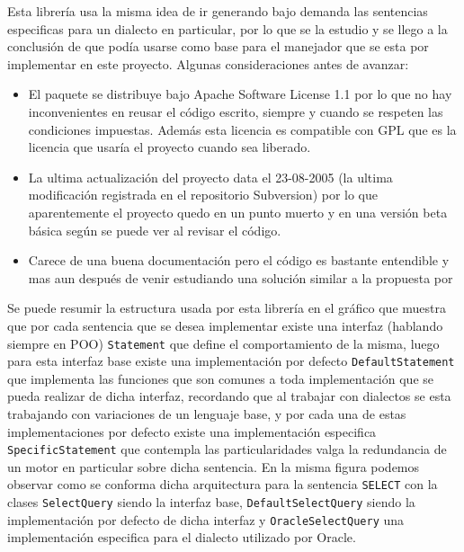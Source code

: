 Esta librería  usa la misma idea de ir generando bajo demanda las sentencias especificas para un dialecto en particular, por lo que se la estudio y se llego a la conclusión de que podía usarse como base para el manejador que se esta por implementar en este proyecto. Algunas consideraciones antes de avanzar:
%
\begin{itemize}
\item El paquete se distribuye bajo Apache Software License 1.1 por lo que no hay inconvenientes en reusar el código escrito, siempre y cuando se respeten las condiciones impuestas. Además esta licencia es compatible con GPL que es la licencia que usaría el proyecto cuando sea liberado.
\item La ultima actualización del proyecto data el 23-08-2005 (la ultima modificación registrada en el repositorio Subversion) por lo que aparentemente el proyecto quedo en un punto muerto y en una versión beta básica según se puede ver al revisar el código.
\item Carece de una buena documentación pero el código es bastante entendible y mas aun después de venir estudiando una solución similar a la propuesta por \cc
\end{itemize}
%
Se puede resumir la estructura usada por esta librería en el gráfico  que muestra que por cada sentencia que se desea implementar existe una interfaz (hablando siempre en POO) \verb=Statement= que define el comportamiento de la misma, luego para esta interfaz base existe una implementación por defecto \verb=DefaultStatement= que implementa las funciones que son comunes a toda implementación que se pueda realizar de dicha interfaz, recordando que al trabajar con dialectos se esta trabajando con variaciones de un lenguaje base, y por cada una de estas implementaciones por defecto existe una implementación especifica \verb=SpecificStatement= que contempla las particularidades valga la redundancia de un motor en particular sobre dicha sentencia. En la misma figura podemos observar como se conforma dicha arquitectura para la sentencia \verb=SELECT= con la clases \verb=SelectQuery= siendo la interfaz base, \verb=DefaultSelectQuery= siendo la implementación por defecto de dicha interfaz y \verb=OracleSelectQuery= una implementación especifica para el dialecto utilizado por Oracle.
%
%
